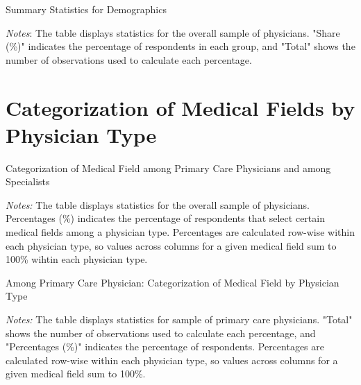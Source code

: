 \documentclass[11pt]{article}
\theoremstyle{definition}
\begin{document}
\begin{table}[H]
    \centering
    \caption{Summary Statistics for Demographics}
              \begin{adjustbox}{width=0.55\linewidth}  

\end{adjustbox}
     \parbox{.9\linewidth}{
        	\vspace{.2cm}
        		\scriptsize{\scriptsize{{\emph{Notes}: The table displays statistics for the overall sample of physicians. "Share (\%)" indicates the percentage of respondents in each group, and "Total" shows the number of observations used to calculate each percentage.}}}}
    \label{tab:demo_table}
\end{table}

\clearpage

\section{Categorization of Medical Fields by Physician Type} 


\begin{table}[H]
    \centering
    \caption{Categorization of Medical Field among Primary Care Physicians and among Specialists}
    \begin{adjustbox}{width=0.95\linewidth}  
    
    \end{adjustbox}
    \label{tab:med_field_cat_phystype}
          {\parbox{1\linewidth}{           %
    		\scriptsize{{{ \textit{Notes:} The table displays statistics for the overall sample of physicians. Percentages (\%) indicates the percentage of respondents that select certain medical fields among a physician type. Percentages are calculated row-wise within each physician type, so values across columns for a given medical field sum to 100\% wihtin each physician type.}}}}}
\end{table}

\begin{table}[H]
    \centering
    \caption{Among Primary Care Physician: Categorization of Medical Field by Physician Type}
    \begin{adjustbox}{width=0.95\linewidth}    
    
    \end{adjustbox}
    \label{tab:med_field_cat_phystype_pc}
          {\parbox{1\linewidth}{           %
    		\scriptsize{{{ \textit{Notes:} The table displays statistics for sample of primary care physicians. "Total" shows the number of observations used to calculate each percentage, and "Percentages (\%)" indicates the percentage of respondents. Percentages are calculated row-wise within each physician type, so values across columns for a given medical field sum to 100\%.}}}}}
\end{table}
\end{document}
